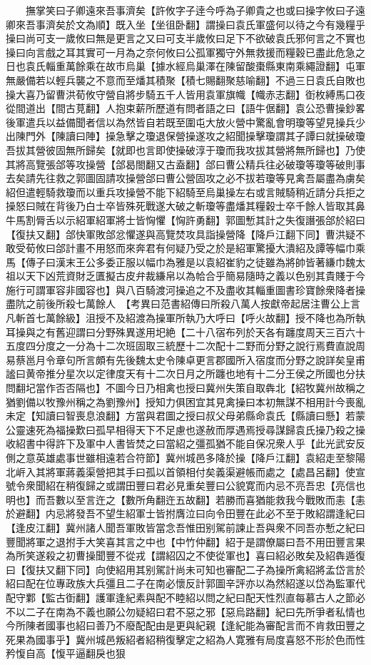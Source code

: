 　　撫掌笑曰子卿遠來吾事濟矣【許攸字子逹今呼為子卿貴之也或曰操字攸曰子遠卿來吾事濟矣於文為順】既入坐【坐徂卧翻】謂操曰袁氏軍盛何以待之今有幾糧乎操曰尚可支一歲攸曰無是更言之又曰可支半歲攸曰足下不欲破袁氏邪何言之不實也操曰向言戲之耳其實可一月為之奈何攸曰公孤軍獨守外無救援而糧穀已盡此危急之日也袁氏輜重萬餘乘在故市烏巢【據水經烏巢澤在陳留酸棗縣東南乘繩證翻】屯軍無嚴備若以輕兵襲之不意而至燔其積聚【積七賜翻聚慈喻翻】不過三日袁氏自敗也操大喜乃留曹洪荀攸守營自將步騎五千人皆用袁軍旗幟【幟赤志翻】衘枚縛馬口夜從間道出【間古莧翻】人抱束薪所歷道有問者語之曰【語牛倨翻】袁公恐曹操鈔畧後軍遣兵以益備聞者信以為然皆自若既至圍屯大放火營中驚亂會明瓊等望見操兵少出陳門外【陳讀曰陣】操急擊之瓊退保營操遂攻之紹聞操擊瓊謂其子譚曰就操破瓊吾拔其營彼固無所歸矣【就即也言即使操破淳于瓊而我攻拔其營將無所歸也】乃使其將高覽張郃等攻操營【郃曷閤翻又古盍翻】郃曰曹公精兵往必破瓊等瓊等破則事去矣請先往救之郭圖固請攻操營郃曰曹公營固攻之必不拔若瓊等見禽吾屬盡為虜矣紹但遣輕騎救瓊而以重兵攻操營不能下紹騎至烏巢操左右或言賊騎稍近請分兵拒之操怒曰賊在背後乃白士卒皆殊死戰遂大破之斬瓊等盡燔其糧穀士卒千餘人皆取其鼻牛馬割脣舌以示紹軍紹軍將士皆恟懼【恟許勇翻】郭圖慙其計之失復譖張郃於紹曰【復扶又翻】郃快軍敗郃忿懼遂與高覽焚攻具詣操營降【降戶江翻下同】曹洪疑不敢受荀攸曰郃計畫不用怒而來奔君有何疑乃受之於是紹軍驚擾大潰紹及譚等幅巾乘馬【傳子曰漢末王公多委正服以幅巾為雅是以袁紹崔豹之徒雖為將帥皆著縑巾魏太祖以天下凶荒資財乏匱擬古皮弁裁縑帛以為帢合乎簡易隨時之義以色别其貴賤于今施行可謂軍容非國容也】與八百騎渡河操追之不及盡收其輜重圖書珍寶餘衆降者操盡阬之前後所殺七萬餘人　【考異曰范書紹傳曰所殺八萬人按獻帝起居注曹公上言凡斬首七萬餘級】沮授不及紹渡為操軍所執乃大呼曰【呼火故翻】授不降也為所執耳操與之有舊迎謂曰分野殊異遂用圯絶【二十八宿布列於天各有躔度周天三百六十五度四分度之一分為十二次班固取三統歷十二次配十二野而分野之說行焉費直說周易蔡邕月令章句所言頗有先後魏太史令陳卓更言郡國所入宿度而分野之說詳矣皇甫謐曰黄帝推分星次以定律度天有十二次日月之所躔也地有十二分王侯之所國也分扶問翻圮當作否否隔也】不圖今日乃相禽也授曰冀州失策自取犇北【紹牧冀州故稱之猶劉備以牧豫州稱之為劉豫州】授知力俱困宜其見禽操曰本初無謀不相用計今喪亂未定【知讀曰智喪息浪翻】方當與君圖之授曰叔父母弟縣命袁氏【縣讀曰懸】若蒙公靈速死為福操歎曰孤早相得天下不足慮也遂赦而厚遇焉授尋謀歸袁氏操乃殺之操收紹書中得許下及軍中人書皆焚之曰當紹之彊孤猶不能自保况衆人乎【此光武安反側之意英雄處事世雖相遠若合符節】冀州城邑多降於操【降戶江翻】袁紹走至黎陽北㟁入其將軍蔣義渠營把其手曰孤以首領相付矣義渠避帳而處之【處昌呂翻】使宣號令衆聞紹在稍復歸之或謂田豐曰君必見重矣豐曰公貌寛而内忌不亮吾忠【亮信也明也】而吾數以至言迕之【數所角翻迕五故翻】若勝而喜猶能救我今戰敗而恚【恚於避翻】内忌將發吾不望生紹軍士皆拊膺泣曰向令田豐在此必不至于敗紹謂逢紀曰【逢皮江翻】冀州諸人聞吾軍敗皆當念吾惟田别駕前諫止吾與衆不同吾亦慙之紀曰豐聞將軍之退拊手大笑喜其言之中也【中竹仲翻】紹于是謂僚屬曰吾不用田豐言果為所笑遂殺之初曹操聞豐不從戎【謂紹囚之不使從軍也】喜曰紹必敗矣及紹犇遁復曰【復扶又翻下同】向使紹用其别駕計尚未可知也審配二子為操所禽紹將孟岱言於紹曰配在位專政族大兵彊且二子在南必懷反計郭圖辛評亦以為然紹遂以岱為監軍代配守鄴【監古衘翻】護軍逢紀素與配不睦紹以問之紀曰配天性烈直每慕古人之節必不以二子在南為不義也願公勿疑紹曰君不惡之邪【惡烏路翻】紀曰先所爭者私情也今所陳者國事也紹曰善乃不廢配配由是更與紀親【逢紀能為審配言而不肯救田豐之死果為國事乎】冀州城邑叛紹者紹稍復擊定之紹為人寛雅有局度喜怒不形於色而性矜愎自高【愎平逼翻戾也狠